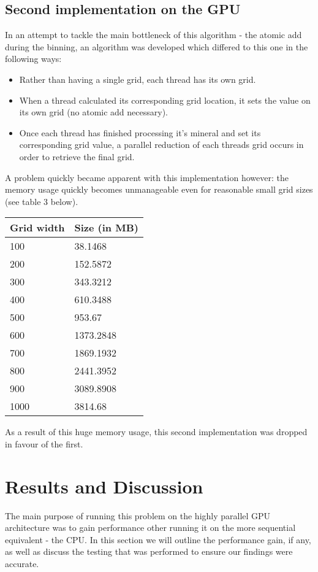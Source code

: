 \documentclass[11pt]{IEEEtran}
\begin{document}
\subsection{Second implementation on the GPU}
In an attempt to tackle the main bottleneck of this algorithm - the atomic add during the binning, an algorithm was developed which differed to this one in the following ways:
	\begin{itemize}
		\item Rather than having a single grid, each thread has its own grid. 
		\item When a thread calculated its corresponding grid location, it sets the value on its own grid (no atomic add necessary).
		\item Once each thread has finished processing it's mineral and set its corresponding grid value, a parallel reduction of each threads grid occurs in order to retrieve the final grid.\\
	\end{itemize}
	A problem quickly became apparent with this implementation however: the memory usage quickly becomes unmanageable even for reasonable small grid sizes (see table 3 below).
  \begin{center}	
    \begin{tabular}{|p{2cm}|p{4cm}|}
  	\hline
	\textbf{Grid width} & \textbf{Size (in MB)} \\
	\hline
	100	& 38.1468\\
	\hline
	200	& 152.5872\\
  	\hline
	300	& 343.3212\\
  	\hline
	400	& 610.3488\\
  	\hline
	500	& 953.67\\
  	\hline
	600	& 1373.2848\\
	\hline
	700	& 1869.1932\\
  	\hline
	800	& 2441.3952\\
  	\hline
	900	& 3089.8908\\
  	\hline
	1000	 & 3814.68\\
  	\hline
  	\end{tabular}
  \end{center}
As a result of this huge memory usage, this second implementation was dropped in favour of the first.

\section{Results and Discussion}
The main purpose of running this problem on the highly parallel GPU architecture was to gain performance other running it on the more sequential equivalent - the CPU. In this section we will outline the performance gain, if any, as well as discuss the testing that was performed to ensure our findings were accurate.
\end{document}
